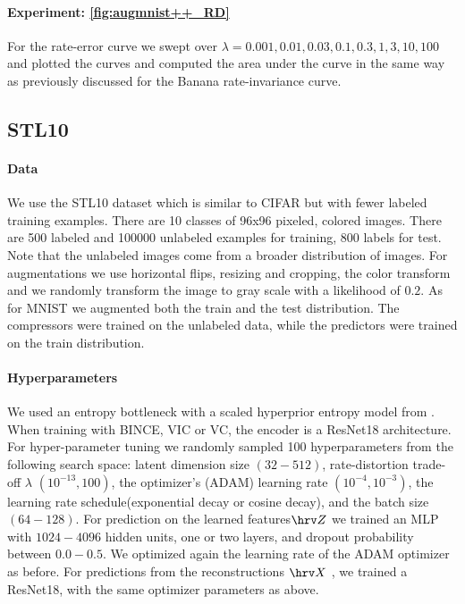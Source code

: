 \documentclass[final]{article}
\begin{document}
\paragraph{Experiment: \cref{fig:augmnist++_RD}}
For the rate-error curve we swept over $\lambda=0.001,0.01,0.03,0.1,0.3,1,3,10,100$ and plotted the curves and computed the area under the curve in the same way as previously discussed for the Banana rate-invariance curve.




\subsection{STL10}
\label{appx:reproducability_stl10}

\paragraph{Data}
We use the STL10 dataset \cite{coates_analysis_2011} which is similar to CIFAR but with fewer labeled training examples. There are 10 classes of 96x96 pixeled, colored images. There are 500 labeled and 100000 unlabeled examples for training, 800 labels for test. Note that the unlabeled images come from a broader distribution of images.
For augmentations we use horizontal flips, resizing and cropping, the color transform and we randomly transform the image to gray scale with a likelihood of $0.2$.
As for MNIST we augmented both the train and the test distribution.
The compressors were trained on the unlabeled data, while the predictors were trained on the train distribution.

\paragraph{Hyperparameters}
We used an entropy bottleneck with a scaled hyperprior entropy model from \cite{balle_variational_2018}.  
When training with BINCE, VIC or VC, the encoder is a ResNet18 architecture. For hyper-parameter tuning we randomly sampled 100 hyperparameters from the following search space:  latent dimension size $(32-512)$, rate-distortion trade-off $\lambda$ $(10^{-13},100)$, the optimizer's (ADAM) learning rate $(10^{-4},10^{-3})$, the learning rate schedule(exponential decay or cosine decay), and the batch size $(64-128)$.
For prediction on the learned features$\hrv Z$ we trained an MLP with $1024-4096$ hidden units, one or two layers, and dropout probability between $0.0-0.5$. We optimized again the learning rate of the ADAM optimizer as before.
For predictions from the reconstructions $\hrv X$ , we trained a ResNet18, with the same optimizer parameters as above.
\end{document}
